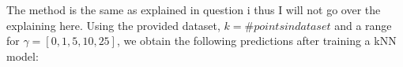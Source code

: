 \documentclass[10pt]{article}
\begin{document}
The method is the same as explained in question i thus I will not go over the explaining here. Using the provided
dataset, $ k = \# points in dataset$ and a range for $\gamma = [0, 1, 5, 10, 25]$, we obtain the following predictions after
training a kNN model:

\begin{figure}[H]    

\end{figure}
\end{document}
